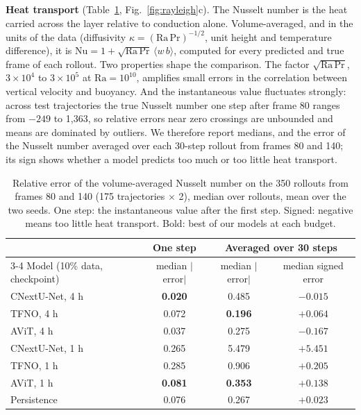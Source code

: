 \documentclass[11pt]{article}
\begin{document}
\textbf{Heat transport} (Table~\ref{tab:nusselt}, Fig.~\ref{fig:rayleigh}c). The Nusselt number is the heat carried
across the layer relative to conduction alone. Volume-averaged, and in the units of the data (diffusivity
$\kappa=(\mathrm{Ra}\,\mathrm{Pr})^{-1/2}$, unit height and temperature difference), it is
$\mathrm{Nu}=1+\sqrt{\mathrm{Ra}\,\mathrm{Pr}}\,\langle w\,b\rangle$, computed for every predicted and true frame of
each rollout. Two properties shape the comparison. The factor $\sqrt{\mathrm{Ra}\,\mathrm{Pr}}$, $3\times10^4$ to $3\times10^5$ at
$\mathrm{Ra}=10^{10}$, amplifies small errors in the correlation between vertical velocity and buoyancy. And the
instantaneous value fluctuates strongly: across test trajectories the true Nusselt number one step after frame 80
ranges from $-249$ to 1,363, so relative errors near zero crossings are unbounded and means are dominated by outliers. We
therefore report medians, and the error of the Nusselt number averaged over each 30-step rollout from frames 80 and
140; its sign shows whether a model predicts too much or too little heat transport.

\begin{table}[!htbp]
\centering\small
\begin{tabular}{@{}lccc@{}}
\toprule
& One step & \multicolumn{2}{c}{Averaged over 30 steps} \\
\cmidrule(l){3-4}
Model (10\% data, checkpoint) & median $|$error$|$ & median $|$error$|$ & median signed error \\
\midrule
CNextU-Net, 4 h & \textbf{0.020} & 0.485 & $-0.015$ \\
TFNO, 4 h & 0.072 & \textbf{0.196} & $+0.064$ \\
AViT, 4 h & 0.037 & 0.275 & $-0.167$ \\
\midrule
CNextU-Net, 1 h & 0.265 & 5.479 & $+5.451$ \\
TFNO, 1 h & 0.285 & 0.906 & $+0.205$ \\
AViT, 1 h & \textbf{0.081} & \textbf{0.353} & $+0.138$ \\
\midrule
Persistence & 0.076 & 0.267 & $+0.023$ \\
\bottomrule
\end{tabular}
\caption{Relative error of the volume-averaged Nusselt number on the 350 rollouts from frames 80 and 140 (175
trajectories $\times$ 2), median over rollouts, mean over the two seeds. One step: the instantaneous value after
the first step. Signed: negative means too little heat transport. Bold: best of our models at each budget.}
\label{tab:nusselt}
\end{table}
\end{document}
